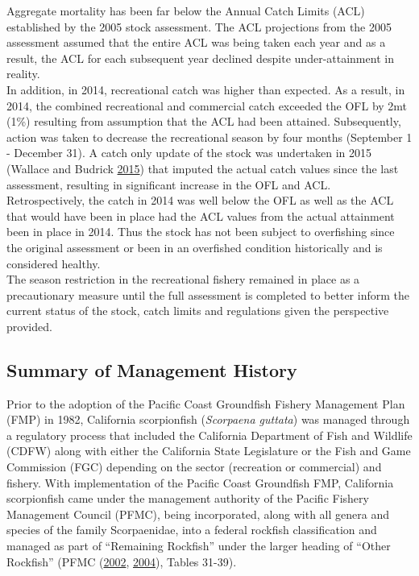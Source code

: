 \documentclass[12pt,]{article}
\begin{document}
Aggregate mortality has been far below the Annual Catch Limits (ACL)
established by the 2005 stock assessment. The ACL projections from the
2005 assessment assumed that the entire ACL was being taken each year
and as a result, the ACL for each subsequent year declined despite
under-attainment in reality.\\
In addition, in 2014, recreational catch was higher than expected. As a
result, in 2014, the combined recreational and commercial catch exceeded
the OFL by 2mt (1\%) resulting from assumption that the ACL had been
attained. Subsequently, action was taken to decrease the recreational
season by four months (September 1 - December 31). A catch only update
of the stock was undertaken in 2015 (Wallace and Budrick
\protect\hyperlink{ref-Wallace2015}{2015}) that imputed the actual catch
values since the last assessment, resulting in significant increase in
the OFL and ACL.\\
Retrospectively, the catch in 2014 was well below the OFL as well as the
ACL that would have been in place had the ACL values from the actual
attainment been in place in 2014. Thus the stock has not been subject to
overfishing since the original assessment or been in an overfished
condition historically and is considered healthy.\\
The season restriction in the recreational fishery remained in place as
a precautionary measure until the full assessment is completed to better
inform the current status of the stock, catch limits and regulations
given the perspective provided.

\subsection{Summary of Management
History}\label{summary-of-management-history}

Prior to the adoption of the Pacific Coast Groundfish Fishery Management
Plan (FMP) in 1982, California scorpionfish (\emph{Scorpaena guttata})
was managed through a regulatory process that included the California
Department of Fish and Wildlife (CDFW) along with either the California
State Legislature or the Fish and Game Commission (FGC) depending on the
sector (recreation or commercial) and fishery. With implementation of
the Pacific Coast Groundfish FMP, California scorpionfish came under the
management authority of the Pacific Fishery Management Council (PFMC),
being incorporated, along with all genera and species of the family
Scorpaenidae, into a federal rockfish classification and managed as part
of ``Remaining Rockfish'' under the larger heading of ``Other Rockfish''
(PFMC (\protect\hyperlink{ref-PFMC2002}{2002},
\protect\hyperlink{ref-PFMC2004}{2004}), Tables 31-39).
\end{document}
